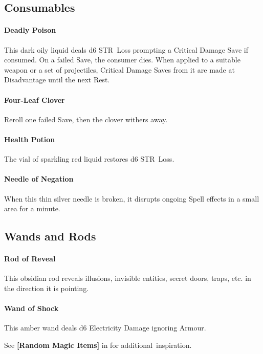 \documentclass[itdr/core]{subfiles}
\begin{document}
\vfill

\subsection*{Consumables}

\paragraph{Deadly Poison}
This dark oily liquid deals d6 STR~Loss prompting a Critical Damage Save if consumed. On a failed Save, the consumer dies. When applied to a suitable weapon or a set of projectiles, Critical Damage Saves from it are made at Disadvantage until the next Rest.

\paragraph{Four-Leaf Clover}
Reroll one failed Save, then the clover withers away.

\paragraph{Health Potion}
The vial of sparkling red liquid restores d6 STR~Loss.

\paragraph{Needle of Negation}
When this thin silver needle is broken, it disrupts ongoing Spell effects in a small area for a minute.

\vfill

\subsection*{Wands and Rods}

\paragraph{Rod of Reveal}
This obsidian rod reveals illusions, invisible entities, secret doors, traps, etc. in the direction it is pointing.

\paragraph{Wand of Shock}
This amber wand deals d6 Electricity Damage \mbox{ignoring} Armour.

\vfill

\begin{dbox}
	See \textbf{[Random Magic Items]} in \textbf{} for \mbox{additional inspiration}.
\end{dbox}

\vfill
\end{document}
